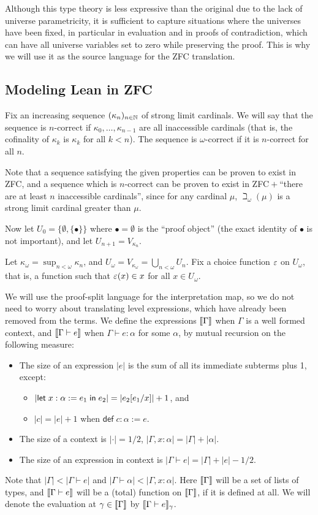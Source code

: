Although this type theory is less expressive than the original due to the lack of universe parametricity, it is sufficient to capture situations where the universes have been fixed, in particular in evaluation and in proofs of contradiction, which can have all universe variables set to zero while preserving the proof. This is why we will use it as the source language for the ZFC translation.

\subsection{Modeling Lean in ZFC}
Fix an increasing sequence $(\kappa_n)_{n\in\mathbb{N}}$ of strong limit cardinals. We will say that the sequence is $n$-correct if $\kappa_0,\dots,\kappa_{n-1}$ are all inaccessible cardinals (that is, the cofinality of $\kappa_k$ is $\kappa_k$ for all $k<n$). The sequence is $\omega$-correct if it is $n$-correct for all $n$.

Note that a sequence satisfying the given properties can be proven to exist in ZFC, and a sequence which is $n$-correct can be proven to exist in ZFC${}+{}$``there are at least $n$ inaccessible cardinals'', since for any cardinal $\mu$, $\beth_\omega(\mu)$ is a strong limit cardinal greater than $\mu$.

Now let $U_0=\{\emptyset,\{\bullet\}\}$ where $\bullet=\emptyset$ is the ``proof object'' (the exact identity of $\bullet$ is not important), and let $U_{n+1}=V_{\kappa_n}$.

Let $\kappa_\omega=\operatorname{sup}_{n<\omega}\kappa_n$, and $U_\omega=V_{\kappa_\omega}=\bigcup_{n<\omega} U_n$. Fix a choice function $\varepsilon$ on $U_\omega$, that is, a function such that $\varepsilon(x)\in x$ for all $x\in U_\omega$.

We will use the proof-split language for the interpretation map, so we do not need to worry about translating level expressions, which have already been removed from the terms. We define the expressions $\scott{\Gamma}$ when $\Gamma$ is a well formed context, and $\scott{\Gamma\vdash e}$ when $\Gamma\vdash e:\alpha$ for some $\alpha$, by mutual recursion on the following measure:
\begin{itemize}
\item The size of an expression $|e|$ is the sum of all its immediate subterms plus 1, except:
\begin{itemize}
\item $|\mathsf{let}\;x:\alpha:=e_1\mathrel{\mathsf{in}}e_2|=|e_2[e_1/x]|+1$, and
\item $|c|=|e|+1$ when $\mathsf{def}\;c:\alpha:=e$.
\end{itemize}
\item The size of a context is $|{\cdot}|=1/2$, $|\Gamma,x:\alpha|=|\Gamma|+|\alpha|$.
\item The size of an expression in context is $|\Gamma\vdash e|=|\Gamma|+|e|-1/2$.
\end{itemize}
Note that $|\Gamma|<|\Gamma\vdash e|$ and $|\Gamma\vdash\alpha|<|\Gamma,x:\alpha|$. Here $\scott{\Gamma}$ will be a set of lists of types, and $\scott{\Gamma\vdash e}$ will be a (total) function on $\scott{\Gamma}$, if it is defined at all. We will denote the evaluation at $\gamma\in\scott{\Gamma}$ by $\scott{\Gamma\vdash e}_\gamma$.

